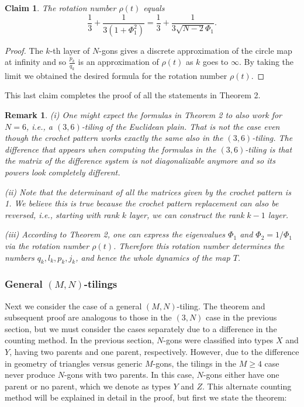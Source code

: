 \documentclass[11pt, oneside]{article}   	%
\newtheorem{claim}{Claim}
\newtheorem{remark}{Remark}
\begin{document}
\begin{claim}
The rotation number $\rho(t)$ equals
$$\frac{1}{3}+\frac{1}{3(1+\Phi_1^2)}=\frac{1}{3}+\frac{1}{3\sqrt{N-2}\Phi_1}.$$
\end{claim}
\begin{proof}
The $k$-th layer of $N$-gons gives a discrete approximation of the circle map at infinity and so $\frac{p_k}{q_k}$ is an approximation of $\rho(t)$ as $k$ goes to $\infty$. By taking the limit we obtained the desired formula for the rotation number $\rho(t)$.
\end{proof}

This last claim completes the proof of all the statements in Theorem 2. 

\begin{remark}
{\rm 
(i) One might expect the formulas in Theorem 2 to also work for $N=6$, i.e., a $(3,6)$-tiling of the Euclidean plain. That is not the case even though the crochet pattern works exactly the same also in the $(3,6)$-tiling. The difference that appears when computing the formulas in the $(3,6)$-tiling is that the matrix of the difference system is not diagonalizable anymore and so its powers look completely different. 

(ii) Note that the determinant of all the matrices given by the crochet pattern is 1. We believe this is true because the crochet pattern replacement can also be reversed, i.e., starting with rank $k$ layer, we can construct the rank $k-1$ layer.

(iii) According to Theorem 2, one can express the eigenvalues $\Phi_1$ and $\Phi_2=1/\Phi_1$ via the rotation number $\rho(t)$. Therefore this rotation number determines the numbers $q_k,l_k,p_k,j_k$, and hence the whole dynamics of the map $T$. 
}
\end{remark}


\subsubsection{General $(M,N)$-tilings}
\indent \indent Next we consider the case of a general $(M,N)$-tiling. The theorem and subsequent proof are analogous to those in the $(3,N)$ case in the previous section, but we must consider the cases separately due to a difference in the counting method. In the previous section, $N$-gons were classified into types $X$ and $Y$, having two parents and one parent, respectively. However, due to the difference in geometry of triangles versus generic $M$-gons, the tilings in the $M\ge4$ case never produce $N$-gons with two parents. In this case, $N$-gons either have one parent or no parent, which we denote as types $Y$ and $Z$. This alternate counting method will be explained in detail in the proof, but first we state the theorem:
\end{document}
